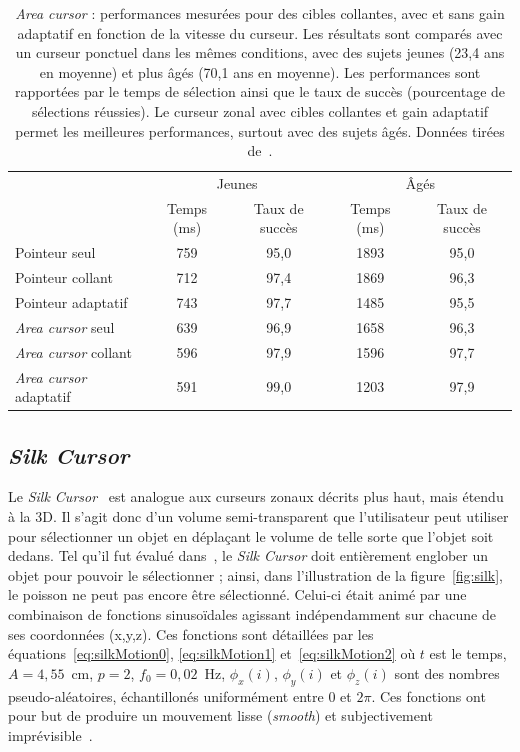 \begin{appendices}
	\begin{table}
	\centering
	\begin{tabular}{l c c c c}
										& \multicolumn{2}{c}{Jeunes}	&	\multicolumn{2}{c}{Âgés}			\\
										& Temps (ms)	& Taux de succès	& Temps (ms)	& Taux de succès	\\
		Pointeur seul					& 759			& 95,0				& 1893			& 95,0				\\
		Pointeur collant				& 712			& 97,4				& 1869			& 96,3				\\
		Pointeur adaptatif				& 743			& 97,7				& 1485			& 95,5				\\
		\emph{Area cursor} seul			& 639			& 96,9				& 1658			& 96,3				\\
		\emph{Area cursor} collant		& 596			& 97,9				& 1596			& 97,7				\\
		\emph{Area cursor} adaptatif	& 591			& 99,0				& 1203			& 97,9				\\
	\end{tabular}
	\caption[\emph{Area cursor} -- performances]{\emph{Area cursor} : performances mesurées pour des cibles collantes, avec et sans gain adaptatif en fonction de la vitesse du curseur. Les résultats sont comparés avec un curseur ponctuel dans les mêmes conditions, avec des sujets jeunes (23,4 ans en moyenne) et plus âgés (70,1 ans en moyenne). Les performances sont rapportées par le temps de sélection ainsi que le taux de succès (pourcentage de sélections réussies). Le curseur zonal avec cibles collantes et gain adaptatif permet les meilleures performances, surtout avec des sujets âgés. Données tirées de~\cite{worden1997making}.}
	\label{tab:areaCursor}
	\end{table}

	\subsection{\emph{Silk Cursor}}
	\label{sub:silkCursor}
	Le \emph{Silk Cursor}~\cite{zhai1994silk} est analogue aux curseurs zonaux décrits plus haut, mais étendu à la 3D. Il s'agit donc d'un volume semi-transparent que l'utilisateur peut utiliser pour sélectionner un objet en déplaçant le volume de telle sorte que l'objet soit dedans. Tel qu'il fut évalué dans~\cite{zhai1994silk}, le \emph{Silk Cursor} doit entièrement englober un objet pour pouvoir le sélectionner ; ainsi, dans l'illustration de la figure~\ref{fig:silk}, le poisson ne peut pas encore être sélectionné. Celui-ci était animé par une combinaison de fonctions sinusoïdales agissant indépendamment sur chacune de ses coordonnées (x,y,z). Ces fonctions sont détaillées par les équations~\ref{eq:silkMotion0}, \ref{eq:silkMotion1} et~\ref{eq:silkMotion2} où $t$ est le temps, $A = 4,55$~cm, $p = 2$, $f_{0} = 0,02$~Hz, 	$\phi_{x}(i)$, $\phi_{y}(i)$ et $\phi_{z}(i)$ sont des nombres pseudo-aléatoires, échantillonés uniformément entre $0$ et $2\pi$. Ces fonctions ont pour but de produire un mouvement lisse (\emph{smooth}) et subjectivement imprévisible~\cite{zhai1993human}.
	

\end{appendices}

